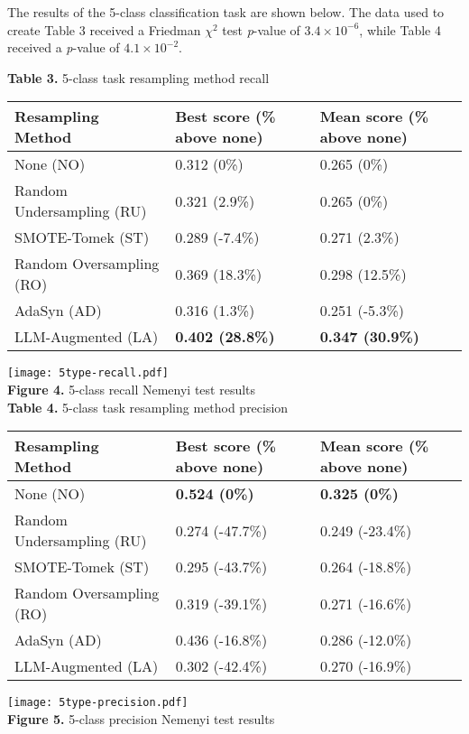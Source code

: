 \documentclass[runningheads]{llncs}
\newenvironment{nscenter}
 {\parskip=0pt\par\nopagebreak\centering}
 {\par\noindent\ignorespacesafterend}
\begin{document}
The results of the 5-class classification task are shown below. The data used to create Table 3 received a Friedman $\chi^2$ test \emph{p}-value of $3.4 \times 10^{-6}$, while Table 4 received a \emph{p}-value of $4.1 \times 10^{-2}$.
\begin{nscenter}
{\bf Table 3.} 5-class task resampling method recall\\

\begin{tabular}{|l|l|l|}
\hline
Resampling Method & Best score (\% above none) & Mean score (\% above none) \\\hline
None (NO) & 0.312 (0\%) & 0.265 (0\%) \\\hline
Random Undersampling (RU) & 0.321 (2.9\%) & 0.265 (0\%) \\\hline
SMOTE-Tomek (ST) & 0.289 (-7.4\%) & 0.271 (2.3\%) \\\hline
Random Oversampling (RO) & 0.369 (18.3\%) & 0.298 (12.5\%) \\\hline
AdaSyn (AD) & 0.316 (1.3\%) & 0.251 (-5.3\%) \\\hline
LLM-Augmented (LA) & {\bf 0.402 (28.8\%)} & {\bf 0.347 (30.9\%)} \\\hline
\end{tabular}

\texttt{[image: 5type-recall.pdf]}\\
{\bf Figure 4.} 5-class recall Nemenyi test results\\
\vspace{\baselineskip}
{\bf Table 4.} 5-class task resampling method precision\\

\begin{tabular}{|l|l|l|}
\hline
Resampling Method & Best score (\% above none) & Mean score (\% above none) \\\hline
None (NO) & {\bf 0.524 (0\%)} & {\bf 0.325 (0\%)} \\\hline
Random Undersampling (RU) & 0.274 (-47.7\%) & 0.249 (-23.4\%) \\\hline
SMOTE-Tomek (ST) & 0.295 (-43.7\%) & 0.264 (-18.8\%) \\\hline
Random Oversampling (RO) & 0.319 (-39.1\%) & 0.271 (-16.6\%) \\\hline
AdaSyn (AD) & 0.436 (-16.8\%) & 0.286 (-12.0\%) \\\hline
LLM-Augmented (LA) & 0.302 (-42.4\%) & 0.270 (-16.9\%) \\\hline
\end{tabular}

\texttt{[image: 5type-precision.pdf]}\\
{\bf Figure 5.} 5-class precision Nemenyi test results
\end{nscenter}
\end{document}
